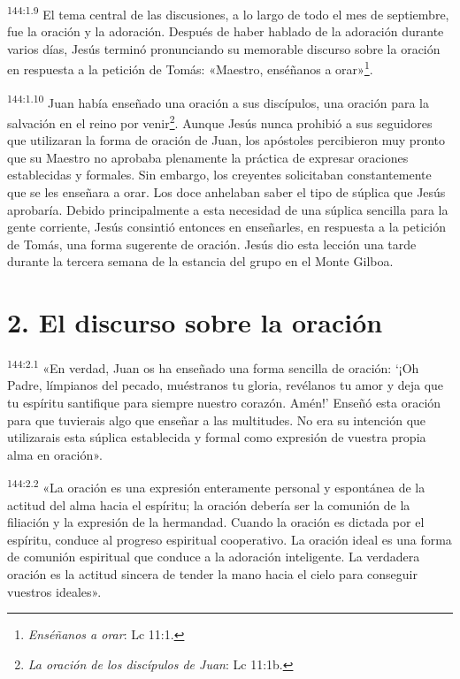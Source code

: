 \par
\textsuperscript{144:1.9} El tema central de las discusiones, a lo largo de todo el mes de septiembre, fue la oración y la adoración. Después de haber hablado de la adoración durante varios días, Jesús terminó pronunciando su memorable discurso sobre la oración en respuesta a la petición de Tomás: «Maestro, enséñanos a orar»\footnote{\textit{Enséñanos a orar}: Lc 11:1.}.

\par
\textsuperscript{144:1.10} Juan había enseñado una oración a sus discípulos, una oración para la salvación en el reino por venir\footnote{\textit{La oración de los discípulos de Juan}: Lc 11:1b.}. Aunque Jesús nunca prohibió a sus seguidores que utilizaran la forma de oración de Juan, los apóstoles percibieron muy pronto que su Maestro no aprobaba plenamente la práctica de expresar oraciones establecidas y formales. Sin embargo, los creyentes solicitaban constantemente que se les enseñara a orar. Los doce anhelaban saber el tipo de súplica que Jesús aprobaría. Debido principalmente a esta necesidad de una súplica sencilla para la gente corriente, Jesús consintió entonces en enseñarles, en respuesta a la petición de Tomás, una forma sugerente de oración. Jesús dio esta lección una tarde durante la tercera semana de la estancia del grupo en el Monte Gilboa.

\section*{2. El discurso sobre la oración}
\par
\textsuperscript{144:2.1} «En verdad, Juan os ha enseñado una forma sencilla de oración: `¡Oh Padre, límpianos del pecado, muéstranos tu gloria, revélanos tu amor y deja que tu espíritu santifique para siempre nuestro corazón. Amén!' Enseñó esta oración para que tuvierais algo que enseñar a las multitudes. No era su intención que utilizarais esta súplica establecida y formal como expresión de vuestra propia alma en oración».

\par
\textsuperscript{144:2.2} «La oración es una expresión enteramente personal y espontánea de la actitud del alma hacia el espíritu; la oración debería ser la comunión de la filiación y la expresión de la hermandad. Cuando la oración es dictada por el espíritu, conduce al progreso espiritual cooperativo. La oración ideal es una forma de comunión espiritual que conduce a la adoración inteligente. La verdadera oración es la actitud sincera de tender la mano hacia el cielo para conseguir vuestros ideales».


